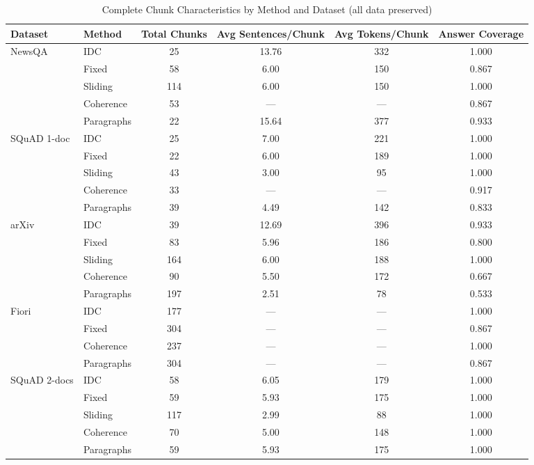 \documentclass[12pt,a4paper]{report}
\begin{document}
\begin{landscape}
\begin{table}[p]
\centering
\caption{Complete Chunk Characteristics by Method and Dataset (all data preserved)}
\label{tab:complete_chunk_chars}
\footnotesize
\begin{tabular}{llcccc}
\hline
\textbf{Dataset} & \textbf{Method} & \textbf{Total Chunks} & \textbf{Avg Sentences/Chunk} & \textbf{Avg Tokens/Chunk} & \textbf{Answer Coverage} \\
\hline
\multirow{5}{*}{NewsQA} & IDC & 25 & 13.76 & 332 & 1.000 \\
& Fixed & 58 & 6.00 & 150 & 0.867 \\
& Sliding & 114 & 6.00 & 150 & 1.000 \\
& Coherence & 53 & --- & --- & 0.867 \\
& Paragraphs & 22 & 15.64 & 377 & 0.933 \\
\hline
\multirow{5}{*}{SQuAD 1-doc} & IDC & 25 & 7.00 & 221 & 1.000 \\
& Fixed & 22 & 6.00 & 189 & 1.000 \\
& Sliding & 43 & 3.00 & 95 & 1.000 \\
& Coherence & 33 & --- & --- & 0.917 \\
& Paragraphs & 39 & 4.49 & 142 & 0.833 \\
\hline
\multirow{5}{*}{arXiv} & IDC & 39 & 12.69 & 396 & 0.933 \\
& Fixed & 83 & 5.96 & 186 & 0.800 \\
& Sliding & 164 & 6.00 & 188 & 1.000 \\
& Coherence & 90 & 5.50 & 172 & 0.667 \\
& Paragraphs & 197 & 2.51 & 78 & 0.533 \\
\hline
\multirow{4}{*}{Fiori} & IDC & 177 & --- & --- & 1.000 \\
& Fixed & 304 & --- & --- & 0.867 \\
& Coherence & 237 & --- & --- & 1.000 \\
& Paragraphs & 304 & --- & --- & 0.867 \\
\hline
\multirow{5}{*}{SQuAD 2-docs} & IDC & 58 & 6.05 & 179 & 1.000 \\
& Fixed & 59 & 5.93 & 175 & 1.000 \\
& Sliding & 117 & 2.99 & 88 & 1.000 \\
& Coherence & 70 & 5.00 & 148 & 1.000 \\
& Paragraphs & 59 & 5.93 & 175 & 1.000 \\
\hline
\end{tabular}
\end{table}
\end{landscape}
\end{document}

